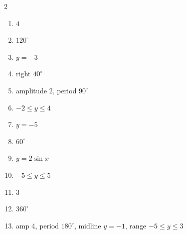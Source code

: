 \documentclass[11pt]{article}
\begin{document}
\begin{keybox}
\begin{multicols}{2}
\small
\begin{enumerate}[leftmargin=*,itemsep=3pt]
  \item $4$
  \item $120^\circ$
  \item $y=-3$
  \item right $40^\circ$
  \item amplitude $2$, period $90^\circ$
  \item $-2\le y\le4$
  \item $y=-5$
  \item $60^\circ$
  \item $y=2\sin x$
  \item $-5\le y\le5$
  \item $3$
  \item $360^\circ$
  \item amp $4$, period $180^\circ$, midline $y=-1$, range $-5\le y\le3$
\end{enumerate}
\end{multicols}
\end{keybox}
\end{document}
